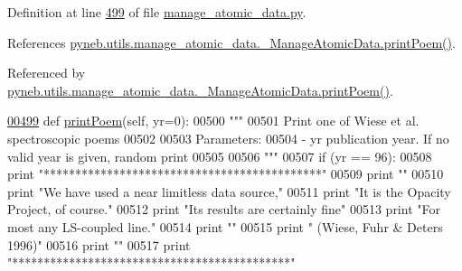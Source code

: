 Definition at line \hyperlink{manage__atomic__data_8py_source_l00499}{499} of file \hyperlink{manage__atomic__data_8py_source}{manage\+\_\+atomic\+\_\+data.\+py}.



References \hyperlink{manage__atomic__data_8py_source_l00499}{pyneb.\+utils.\+manage\+\_\+atomic\+\_\+data.\+\_\+\+Manage\+Atomic\+Data.\+print\+Poem()}.



Referenced by \hyperlink{manage__atomic__data_8py_source_l00499}{pyneb.\+utils.\+manage\+\_\+atomic\+\_\+data.\+\_\+\+Manage\+Atomic\+Data.\+print\+Poem()}.


\begin{DoxyCode}
\hypertarget{classpyneb_1_1utils_1_1manage__atomic__data_1_1___manage_atomic_data_l00499}{}\hyperlink{classpyneb_1_1utils_1_1manage__atomic__data_1_1___manage_atomic_data_a780a8f85e8acf64b44b2bce4b4292386}{00499}     \textcolor{keyword}{def }\hyperlink{classpyneb_1_1utils_1_1manage__atomic__data_1_1___manage_atomic_data_a780a8f85e8acf64b44b2bce4b4292386}{printPoem}(self, yr=0):
00500         \textcolor{stringliteral}{"""}
00501 \textcolor{stringliteral}{        Print one of Wiese et al. spectroscopic poems}
00502 \textcolor{stringliteral}{        }
00503 \textcolor{stringliteral}{        Parameters:}
00504 \textcolor{stringliteral}{            - yr     publication year. If no valid year is given, random print}
00505 \textcolor{stringliteral}{ }
00506 \textcolor{stringliteral}{        """}
00507         \textcolor{keywordflow}{if} (yr == 96):
00508             \textcolor{keywordflow}{print} \textcolor{stringliteral}{"********************************************"}
00509             \textcolor{keywordflow}{print} \textcolor{stringliteral}{""}
00510             \textcolor{keywordflow}{print} \textcolor{stringliteral}{"We have used a near limitless data source,"}
00511             \textcolor{keywordflow}{print} \textcolor{stringliteral}{"It is the Opacity Project, of course."}
00512             \textcolor{keywordflow}{print} \textcolor{stringliteral}{"Its results are certainly fine"}
00513             \textcolor{keywordflow}{print} \textcolor{stringliteral}{"For most any LS-coupled line."}        
00514             \textcolor{keywordflow}{print} \textcolor{stringliteral}{""}
00515             \textcolor{keywordflow}{print} \textcolor{stringliteral}{"            (Wiese, Fuhr & Deters 1996)"}
00516             \textcolor{keywordflow}{print} \textcolor{stringliteral}{""}
00517             \textcolor{keywordflow}{print} \textcolor{stringliteral}{"********************************************"}

\end{DoxyCode}
